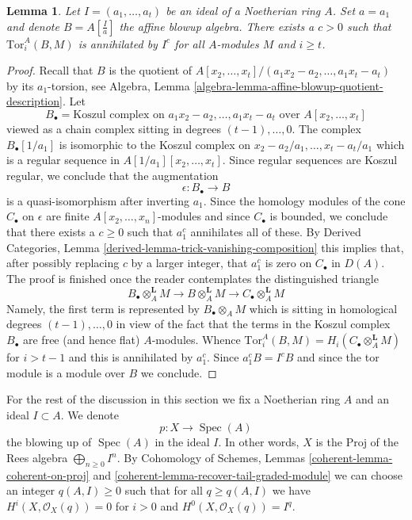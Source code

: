\documentclass{stacks-project}
\theoremstyle{plain}
\newtheorem{lemma}[subsection]{Lemma}
\theoremstyle{definition}
\theoremstyle{remark}
\numberwithin{equation}{subsection}
\def\Spec{\mathop{\mathrm{Spec}}}
\begin{document}
\begin{lemma}
\label{lemma-annihilates-affine}
Let $I = (a_1, \ldots, a_t)$ be an ideal of a Noetherian ring $A$.
Set $a = a_1$ and denote $B = A[\frac{I}{a}]$ the affine blowup algebra.
There exists a $c > 0$ such that $\text{Tor}_i^A(B, M)$ is annihilated
by $I^c$ for all $A$-modules $M$ and $i \geq t$.
\end{lemma}

\begin{proof}
Recall that $B$ is the quotient of
$A[x_2, \ldots, x_t]/(a_1x_2 - a_2, \ldots, a_1x_t - a_t)$
by its $a_1$-torsion, see
Algebra, Lemma \ref{algebra-lemma-affine-blowup-quotient-description}. Let
$$
B_\bullet = \text{Koszul complex on }a_1x_2 - a_2, \ldots, a_1x_t - a_t
\text{ over }A[x_2, \ldots, x_t]
$$
viewed as a chain complex sitting in degrees $(t - 1), \ldots, 0$.
The complex $B_\bullet[1/a_1]$ is isomorphic to the Koszul complex
on $x_2 - a_2/a_1, \ldots, x_t - a_t/a_1$ which is a regular sequence
in $A[1/a_1][x_2, \ldots, x_t]$. Since regular sequences are
Koszul regular, we conclude that the augmentation
$$
\epsilon : B_\bullet \longrightarrow B
$$
is a quasi-isomorphism after inverting $a_1$. Since the homology modules
of the cone $C_\bullet$ on $\epsilon$ are finite $A[x_2, \ldots, x_n]$-modules
and since $C_\bullet$ is bounded,
we conclude that there exists a $c \geq 0$ such that $a_1^c$
annihilates all of these. By
Derived Categories, Lemma \ref{derived-lemma-trick-vanishing-composition}
this implies that, after possibly replacing $c$ by a larger integer,
that $a_1^c$ is zero on $C_\bullet$ in $D(A)$.
The proof is finished once the reader contemplates
the distinguished triangle
$$
B_\bullet \otimes_A^\mathbf{L} M \to
B \otimes_A^\mathbf{L} M \to
C_\bullet \otimes_A^\mathbf{L} M
$$
Namely, the first term is represented by $B_\bullet \otimes_A M$ which
is sitting in homological degrees $(t - 1), \ldots, 0$
in view of the fact that the terms in the Koszul complex $B_\bullet$
are free (and hence flat) $A$-modules. Whence
$\text{Tor}_i^A(B, M) = H_i(C_\bullet \otimes_A^\mathbf{L} M)$
for $i > t - 1$ and this is annihilated by $a_1^c$.
Since $a_1^cB = I^cB$ and since the tor module is a module
over $B$ we conclude.
\end{proof}

\noindent
For the rest of the discussion in this section we fix a Noetherian ring $A$
and an ideal $I \subset A$. We denote
$$
p : X \to \Spec(A)
$$
the blowing up of $\Spec(A)$ in the ideal $I$. In other words, $X$ is the
$\text{Proj}$ of the Rees algebra $\bigoplus_{n \geq 0} I^n$.
By Cohomology of Schemes, Lemmas \ref{coherent-lemma-coherent-on-proj} and
\ref{coherent-lemma-recover-tail-graded-module}
we can choose an integer $q(A, I) \geq 0$ such that for all $q \geq q(A, I)$
we have $H^i(X, \mathcal{O}_X(q)) = 0$ for
$i > 0$ and $H^0(X, \mathcal{O}_X(q)) = I^q$.
\end{document}
